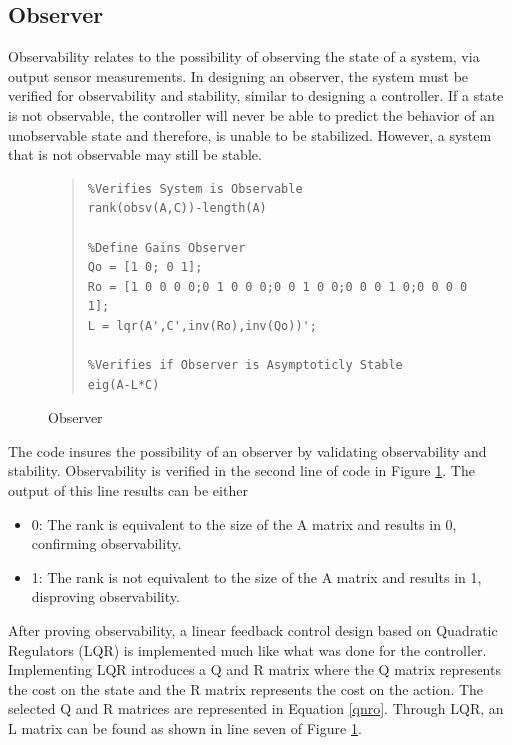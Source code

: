 \documentclass[12pt]{article}
\begin{document}
\subsection{Observer}
Observability relates to the possibility of observing the state of a system, via output sensor measurements. In designing an observer, the system must be verified for observability and stability, similar to designing a controller. If a state is not observable, the controller will never be able to predict the behavior of an unobservable state and therefore, is unable to be stabilized. However, a system that is not observable may still be stable.
\begin{figure}[!h]
\begin{quote}
\begin{lstlisting}
%Verifies System is Observable
rank(obsv(A,C))-length(A)

%Define Gains Observer
Qo = [1 0; 0 1];
Ro = [1 0 0 0 0;0 1 0 0 0;0 0 1 0 0;0 0 0 1 0;0 0 0 0 1];
L = lqr(A',C',inv(Ro),inv(Qo))';

%Verifies if Observer is Asymptoticly Stable
eig(A-L*C)
\end{lstlisting}
\end{quote}
\caption{Observer\label{fig:obsv}}
\end{figure}
The code insures the possibility of an observer by validating observability and stability. Observability is verified in the second line of code in Figure \ref{fig:obsv}. The output of this line results can be either
\begin{itemize}
\item 0: The rank is equivalent to the size of the A matrix and results in 0, confirming observability.
\item 1: The rank is not equivalent to the size of the A matrix and results in 1, disproving observability. 
\end{itemize}
After proving observability, a linear feedback control design based on Quadratic Regulators (LQR) is implemented much like what was done for the controller. Implementing LQR introduces a Q and R matrix where the Q matrix represents the cost on the state and the R matrix represents the cost on the action. The selected Q and R matrices are represented in Equation \eqref{qnro}. Through LQR, an L matrix can be found as shown in line seven of Figure \ref{fig:obsv}.
\\ \\
\end{document}
